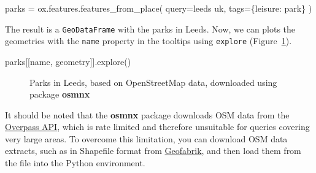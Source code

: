 \documentclass[
  letterpaper,
]{krantz}
\newenvironment{Shaded}{\begin{snugshade}}{\end{snugshade}}
\newcommand{\NormalTok}[1]{\textcolor[rgb]{0.00,0.23,0.31}{#1}}
\newcommand{\OperatorTok}[1]{\textcolor[rgb]{0.37,0.37,0.37}{#1}}
\newcommand{\StringTok}[1]{\textcolor[rgb]{0.13,0.47,0.30}{#1}}
\begin{document}
\begin{Shaded}
\begin{Highlighting}[]
\NormalTok{parks }\OperatorTok{=}\NormalTok{ ox.features.features\_from\_place(}
\NormalTok{    query}\OperatorTok{=}\StringTok{\textquotesingle{}leeds uk\textquotesingle{}}\NormalTok{, }
\NormalTok{    tags}\OperatorTok{=}\NormalTok{\{}\StringTok{\textquotesingle{}leisure\textquotesingle{}}\NormalTok{: }\StringTok{\textquotesingle{}park\textquotesingle{}}\NormalTok{\}}
\NormalTok{)}
\end{Highlighting}
\end{Shaded}

The result is a \texttt{GeoDataFrame} with the parks in Leeds. Now, we
can plots the geometries with the \texttt{name} property in the tooltips
using \texttt{explore} (Figure~\ref{fig-ox-features}).

\begin{Shaded}
\begin{Highlighting}[]
\NormalTok{parks[[}\StringTok{\textquotesingle{}name\textquotesingle{}}\NormalTok{, }\StringTok{\textquotesingle{}geometry\textquotesingle{}}\NormalTok{]].explore()}
\end{Highlighting}
\end{Shaded}

\begin{figure}


\caption{\label{fig-ox-features}Parks in Leeds, based on OpenStreetMap
data, downloaded using package \textbf{osmnx}}

\end{figure}%

It should be noted that the \textbf{osmnx} package downloads OSM data
from the
\href{https://wiki.openstreetmap.org/wiki/Overpass_API}{Overpass API},
which is rate limited and therefore unsuitable for queries covering very
large areas. To overcome this limitation, you can download OSM data
extracts, such as in Shapefile format from
\href{https://download.geofabrik.de/}{Geofabrik}, and then load them
from the file into the Python environment.
\end{document}
